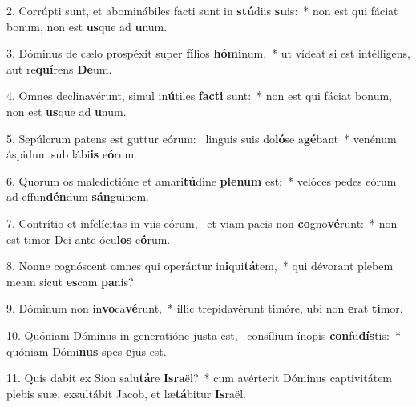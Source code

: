 2. Corrúpti sunt, et abominábiles facti sunt in \textbf{stú}diis \textbf{su}is:~*  non est qui fáciat bonum, non est \textbf{us}que ad \textbf{u}num.\

3. Dóminus de cælo prospéxit super \textbf{fí}lios \textbf{hó}\textbf{mi}num,~*  ut vídeat si est intélligens, aut re\textbf{quí}rens \textbf{De}um.\

4. Omnes declinavérunt, simul in\textbf{ú}tiles \textbf{fac}\textbf{ti} sunt:~*  non est qui fáciat bonum, non est \textbf{us}que ad \textbf{u}num.\

5. Sepúlcrum patens est guttur eórum: \dag\  linguis suis do\textbf{ló}se a\textbf{gé}bant~*  venénum áspidum sub lábi\textbf{is} e\textbf{ó}rum.\

6. Quorum os maledictióne et amari\textbf{tú}dine \textbf{ple}\textbf{num} est:~*  velóces pedes eórum ad effun\textbf{dén}dum \textbf{sán}guinem.\

7. Contrítio et infelícitas in viis eórum, \dag\  et viam pacis non \textbf{co}gno\textbf{vé}runt:~*  non est timor Dei ante ócu\textbf{los} e\textbf{ó}rum.\

8. Nonne cognóscent omnes qui operántur in\textbf{i}qui\textbf{tá}tem,~*  qui dévorant plebem meam sicut \textbf{es}cam \textbf{pa}nis?\

9. Dóminum non in\textbf{vo}ca\textbf{vé}runt,~*  illic trepidavérunt timóre, ubi non \textbf{e}rat \textbf{ti}mor.\

10. Quóniam Dóminus in generatióne justa est, \dag\  consílium ínopis \textbf{con}fu\textbf{dís}tis:~*  quóniam Dómi\textbf{nus} spes \textbf{e}jus est.\

11. Quis dabit ex Sion salu\textbf{tá}re \textbf{Is}\textbf{ra}ël?~*  cum avérterit Dóminus captivitátem plebis suæ, exsultábit Jacob, et læ\textbf{tá}bitur \textbf{Is}raël.\

